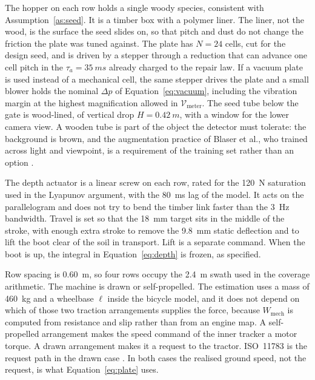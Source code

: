 The hopper on each row holds a single woody species, consistent with Assumption~\ref{as:seed}. It is a timber box with a polymer liner. The liner, not the wood, is the surface the seed slides on, so that pitch and dust do not change the friction the plate was tuned against. The plate has \(N=24\) cells, cut for the design seed, and is driven by a stepper through a reduction that can advance one cell pitch in the \(\tau_a=\SI{35}{ms}\) already charged to the repair law. If a vacuum plate is used instead of a mechanical cell, the same stepper drives the plate and a small blower holds the nominal \(\Delta p\) of Equation~\eqref{eq:vacuum}, including the vibration margin at the highest magnification allowed in \(\mathcal{V}_{\mathrm{meter}}\). The seed tube below the gate is wood-lined, of vertical drop \(H=\SI{0.42}{m}\), with a window for the lower camera view. A wooden tube is part of the object the detector must tolerate: the background is brown, and the augmentation practice of Blaser et al., who trained across light and viewpoint, is a requirement of the training set rather than an option \cite{blaser2024}.

The depth actuator is a linear screw on each row, rated for the \SI{120}{N} saturation used in the Lyapunov argument, with the \SI{80}{ms} lag of the model. It acts on the parallelogram and does not try to bend the timber link faster than the \SI{3}{Hz} bandwidth. Travel is set so that the \SI{18}{mm} target sits in the middle of the stroke, with enough extra stroke to remove the \SI{9.8}{mm} static deflection and to lift the boot clear of the soil in transport. Lift is a separate command. When the boot is up, the integral in Equation~\eqref{eq:depth} is frozen, as specified.

Row spacing is \SI{0.60}{m}, so four rows occupy the \SI{2.4}{m} swath used in the coverage arithmetic. The machine is drawn or self-propelled. The estimation uses a mass of \SI{460}{kg} and a wheelbase \(\ell\) inside the bicycle model, and it does not depend on which of those two traction arrangements supplies the force, because \(W_{\mathrm{mech}}\) is computed from resistance and slip rather than from an engine map. A self-propelled arrangement makes the speed command of the inner tracker a motor torque. A drawn arrangement makes it a request to the tractor. ISO~11783 is the request path in the drawn case \cite{iso11783}. In both cases the realised ground speed, not the request, is what Equation~\eqref{eq:plate} uses.

